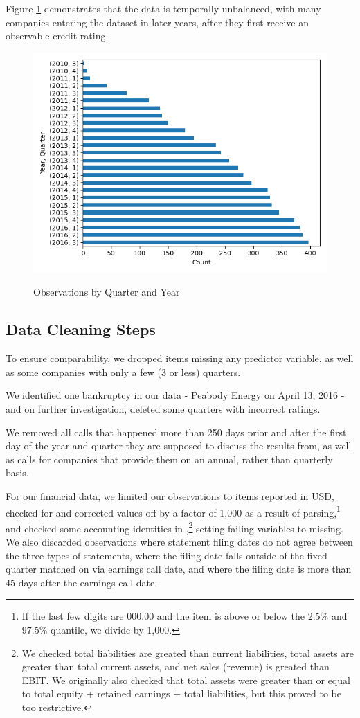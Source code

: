 \documentclass{article}[11pt]
\begin{document}
    Figure \ref{fig:obs-by-quarter-year} demonstrates that the data is temporally unbalanced, with many companies entering the dataset in later years, after they first receive an observable credit rating.

    \begin{figure}[h!]
		\centering
        \caption{Observations by Quarter and Year}
        \includegraphics[width=0.6\linewidth,keepaspectratio=true]{../Output/All Data EDA/Tabular EDA/all_data_fixed_quarter_dates_obs_by_year_quarter_no_title.png}
        \label{fig:obs-by-quarter-year}
	\end{figure}

    \clearpage
    \newpage

    \subsection{Data Cleaning Steps}

    \label{sec:data-cleaning}

    To ensure comparability, we dropped items missing any predictor variable, as well as some companies with only a few (3 or less) quarters. 
    
    We identified one bankruptcy in our data - Peabody Energy on April 13, 2016 - and on further investigation, deleted some quarters with incorrect ratings. 
    
    We removed all calls that happened more than 250 days prior and after the first day of the year and quarter they are supposed to discuss the results from, as well as calls for companies that provide them on an annual, rather than quarterly basis.

    For our financial data, we limited our observations to items reported in USD, checked for and corrected values off by a factor of 1,000 as a result of parsing,\footnote{If the last few digits are 000.00 and the item is above or below the 2.5\% and 97.5\% quantile, we divide by 1,000.} and checked some accounting identities in \cite{das_credit_2023},\footnote{We checked total liabilities are greated than current liabilities, total assets are greater than total current assets, and net sales (revenue) is greated than EBIT. We originally also checked that total assets were greater than or equal to total equity + retained earnings + total liabilities, but this proved to be too restrictive.} setting failing variables to missing. We also discarded observations where statement filing dates do not agree between the three types of statements, where the filing date falls outside of the fixed quarter matched on via earnings call date, and where the filing date is more than 45 days after the earnings call date.
\end{document}
